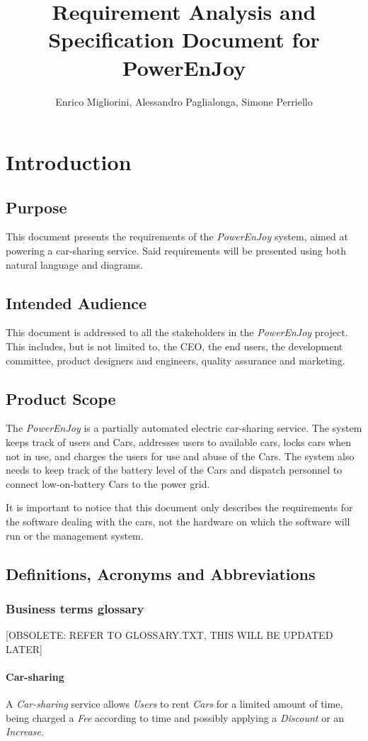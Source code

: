 \documentclass[12pt]{article}
\title{Requirement Analysis and Specification Document for PowerEnJoy}
\author{Enrico Migliorini, Alessandro Paglialonga, Simone Perriello}
\begin{document}
\maketitle
\clearpage
\tableofcontents

\clearpage\section{Introduction}
\subsection{Purpose}
This document presents the requirements of the \emph{PowerEnJoy} system, aimed at powering a car-sharing service. Said requirements will be presented using both natural language and diagrams.
\subsection{Intended Audience}
This document is addressed to all the stakeholders in the \emph{PowerEnJoy} project. This includes, but is not limited to, the CEO, the end users, the development committee, product designers and engineers, quality assurance and marketing.
\subsection{Product Scope}
The \emph{PowerEnJoy} is a partially automated electric car-sharing service. The system keeps track of users and Cars, addresses users to available cars, locks cars when not in use, and charges the users for use and abuse of the Cars. The system also needs to keep track of the battery level of the Cars and dispatch personnel to connect low-on-battery Cars to the power grid.

It is important to notice that this document only describes the requirements for the software dealing with the cars, not the hardware on which the software will run or the management system.
\subsection{Definitions, Acronyms and Abbreviations}
\subsubsection{Business terms glossary}
[OBSOLETE: REFER TO GLOSSARY.TXT, THIS WILL BE UPDATED LATER]
\paragraph{Car-sharing}
A \emph{Car-sharing} service allows \emph{Users} to rent \emph{Cars} for a limited amount of time, being charged a \emph{Fee} according to time and possibly applying a \emph{Discount} or an \emph{Increase}.
\end{document}
